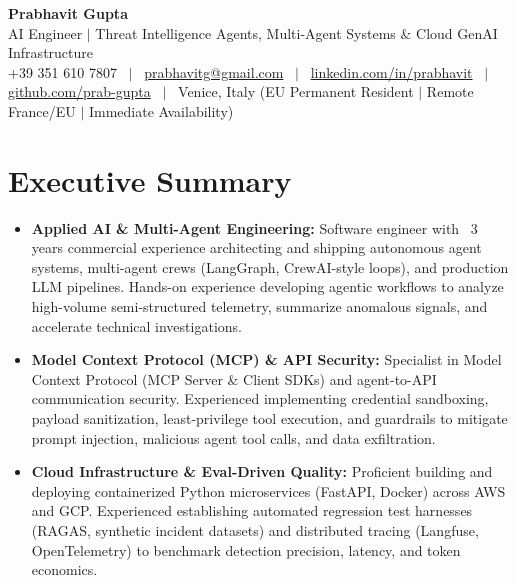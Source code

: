 \documentclass[a4paper,10pt]{article}
\begin{document}
\begin{minipage}[c]{0.80\textwidth}
  {\Huge\bfseries Prabhavit Gupta}\\[3pt]
  {\color{accent}\large AI Engineer $\vert$ Threat Intelligence Agents, Multi-Agent Systems $\&$ Cloud GenAI Infrastructure}\\[6pt]
  {\footnotesize +39 351 610 7807 ~$\vert$~
  \href{mailto:prabhavitg@gmail.com}{prabhavitg@gmail.com} ~$\vert$~
  \href{https://www.linkedin.com/in/prabhavit/}{linkedin.com/in/prabhavit} ~$\vert$~
  \href{https://github.com/prab-gupta}{github.com/prab-gupta} ~$\vert$~
  Venice, Italy (EU Permanent Resident $\vert$ Remote France/EU $\vert$ Immediate Availability)}
\end{minipage}\hfill

\vspace{6pt}

\section{Executive Summary}
\begin{itemize}
  \item \textbf{Applied AI \& Multi-Agent Engineering:} Software engineer with ~3 years commercial experience architecting and shipping autonomous agent systems, multi-agent crews (LangGraph, CrewAI-style loops), and production LLM pipelines. Hands-on experience developing agentic workflows to analyze high-volume semi-structured telemetry, summarize anomalous signals, and accelerate technical investigations.
  \item \textbf{Model Context Protocol (MCP) \& API Security:} Specialist in Model Context Protocol (MCP Server \& Client SDKs) and agent-to-API communication security. Experienced implementing credential sandboxing, payload sanitization, least-privilege tool execution, and guardrails to mitigate prompt injection, malicious agent tool calls, and data exfiltration.
  \item \textbf{Cloud Infrastructure \& Eval-Driven Quality:} Proficient building and deploying containerized Python microservices (FastAPI, Docker) across AWS and GCP. Experienced establishing automated regression test harnesses (RAGAS, synthetic incident datasets) and distributed tracing (Langfuse, OpenTelemetry) to benchmark detection precision, latency, and token economics.
\end{itemize}
\end{document}
